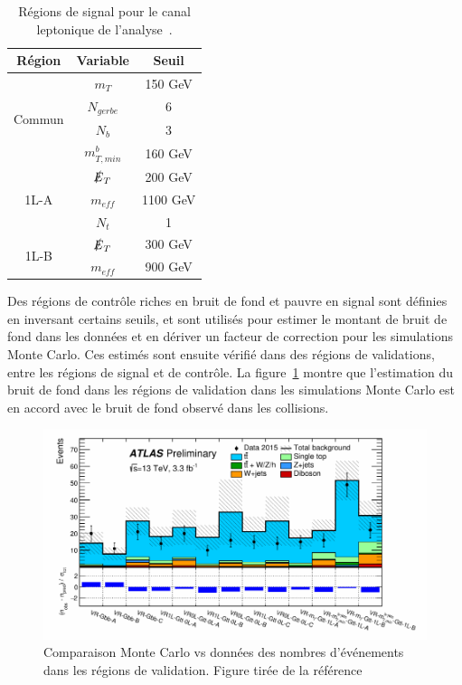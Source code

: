 \begin{table}
  \centering
  \begin{tabular}{c|c|c}
    \hline
    Région & Variable & Seuil
    \\ \hline \hline
    \multirow{4}{*}{Commun}
    & $m_T$ & 150 GeV \\ 
    & $N_{gerbe}$ & 6 \\
    & $N_b$ & 3 \\ \hline
    & $m_{T,min}^b$ & 160 GeV \\ 
    \multirow{3}{*}{1L-A}
    & $\slashed{E}_T$ & 200 GeV \\ 
    & $m_{eff}$ & 1100 GeV \\
    & $N_{t}$ & 1 \\ \hline
    \multirow{2}{*}{1L-B}
    & $\slashed{E}_T$ & 300 GeV \\ 
    & $m_{eff}$ & 900 GeV \\ \hline
  \end{tabular}
\caption{Régions de signal pour le canal leptonique de l'analyse~\cite{ATLAS-CONF-2015-067}.}
\label{tab:sr}
\end{table}

Des régions de contrôle riches en bruit de fond et pauvre en signal
sont définies en inversant certains seuils, et sont utilisés pour
estimer le montant de bruit de fond dans les données et en dériver un
facteur de correction pour les simulations Monte Carlo. Ces estimés sont ensuite
vérifié dans des régions de validations, entre les régions de signal
et de contrôle. La figure~\ref{fig:pull} montre que l'estimation du
bruit de fond dans les régions de validation dans les simulations
Monte Carlo est en accord avec le bruit de fond observé dans les
collisions.

\begin{figure}
  \centering
  \includegraphics[width=.8\textwidth]{pull.pdf}
  \caption{Comparaison Monte Carlo vs données des nombres d'événements
    dans les régions de validation. Figure tirée de la
    référence~\cite{ATLAS-CONF-2015-067}}
\label{fig:pull}
\end{figure}

